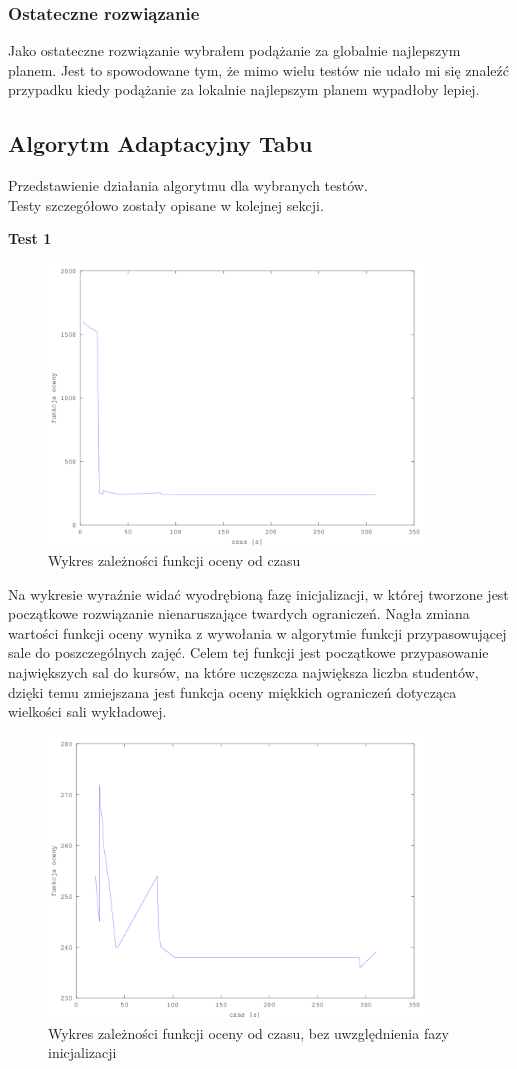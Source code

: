\subsubsection{Ostateczne rozwiązanie}

\par Jako ostateczne rozwiązanie wybrałem podążanie za globalnie najlepszym planem. Jest to spowodowane tym, że mimo wielu testów nie udało mi się znaleźć przypadku kiedy podążanie za lokalnie najlepszym planem wypadłoby lepiej. 
\subsection{Algorytm Adaptacyjny Tabu}
Przedstawienie działania algorytmu dla wybranych testów.\\
Testy szczegółowo zostały opisane w kolejnej sekcji.
\par \textbf{Test 1}
\begin{figure}[H]
  \caption{Wykres zależności funkcji oceny od czasu}
  \centering
    \includegraphics[width=10cm]{ogolny.png}
\end{figure}
Na wykresie wyraźnie widać wyodrębioną fazę inicjalizacji, w której tworzone jest początkowe rozwiązanie nienaruszające twardych ograniczeń. Nagła zmiana wartości funkcji oceny wynika z wywołania w algorytmie funkcji przypasowującej sale do poszczególnych zajęć. Celem tej funkcji jest początkowe przypasowanie największych sal do kursów, na które uczęszcza największa liczba studentów, dzięki temu zmiejszana jest funkcja oceny miękkich ograniczeń dotycząca wielkości sali wykładowej.
\begin{figure}[H]
  \caption{Wykres zależności funkcji oceny od czasu, bez uwzględnienia fazy inicjalizacji}
  \centering
    \includegraphics[width=10cm]{szczeg.png}
\end{figure}
